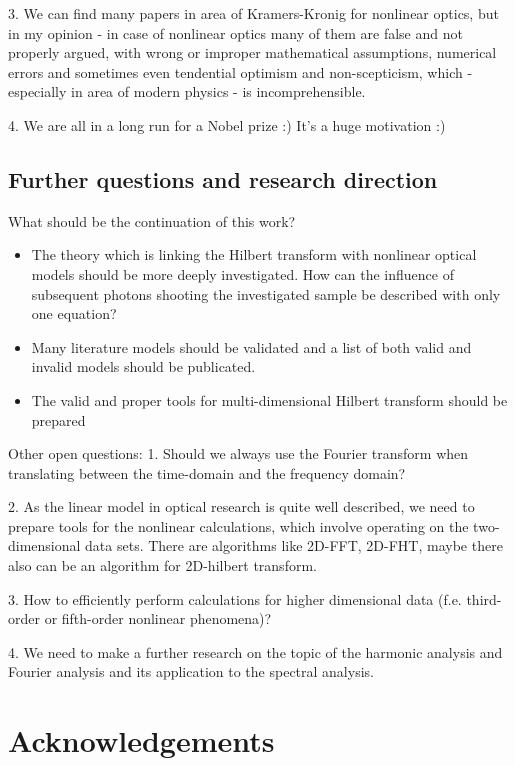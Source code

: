 \documentclass[12pt,twoside,a4paper]{article}
\numberwithin{equation}{subsection}
\numberwithin{figure}{subsection}
\begin{document}
3. We can find many papers in area of Kramers-Kronig for nonlinear optics, but in my opinion - in case of nonlinear optics many of
them are false and not properly argued, with wrong or improper mathematical assumptions, numerical errors and sometimes even
tendential optimism and non-scepticism, which - especially in area of modern physics - is incomprehensible.

4. We are all in a long run for a Nobel prize :) It's a huge motivation :)

\subsection{Further questions and research direction} \label{chap:conclusion_further}

What should be the continuation of this work?

\begin{itemize} 
	\item The theory which is linking the Hilbert transform with nonlinear optical models should be more deeply investigated. How can
	the influence of subsequent photons shooting the investigated sample be described with only one equation?
	\item Many literature models should be validated and a list of both valid and invalid models should be publicated.
	\item The valid and proper tools for multi-dimensional Hilbert transform should be prepared
\end{itemize}


Other open questions:
1. Should we always use the Fourier transform when translating between the time-domain and the frequency domain?

2. As the linear model in optical research is quite well described, we need to prepare tools for the nonlinear calculations, which
involve operating on the two-dimensional data sets. There are algorithms like 2D-FFT, 2D-FHT, maybe there also can be an algorithm
for 2D-hilbert transform.

3. How to efficiently perform calculations for higher dimensional data (f.e. third-order or fifth-order nonlinear phenomena)?

4. We need to make a further research on the topic of the harmonic analysis and Fourier analysis and its application to the
spectral analysis.

\section{Acknowledgements} \label{chap:acknowledgements}
\end{document}
